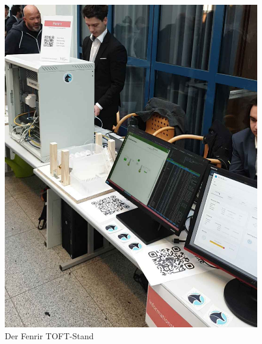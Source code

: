 \documentclass[
	headings=optiontotocandhead,%
	oneside,
	numbers=noenddot,%
	toc=flat, %
	10pt, %
	parskip=full, %
	listof=totoc, %
	listof=flat, %
	numbers=noenddot, %
	bibliography=totoc, %
	a4paper,DIV=14,
]{scrartcl}
\begin{document}
\begin{figure}[h]
	\centering
	\includegraphics[width=0.9\linewidth]{20241112_3}
	\caption[]{Der Fenrir TOFT-Stand}
\end{figure}
\FloatBarrier 

\clearpage
\end{document}
